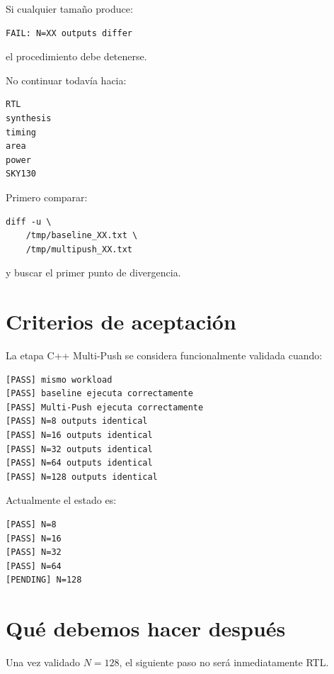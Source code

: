 \documentclass[11pt,a4paper]{article}
\begin{document}
Si cualquier tamaño produce:

\begin{lstlisting}[style=textfile]
FAIL: N=XX outputs differ
\end{lstlisting}

el procedimiento debe detenerse.

No continuar todavía hacia:

\begin{lstlisting}[style=textfile]
RTL
synthesis
timing
area
power
SKY130
\end{lstlisting}

Primero comparar:

\begin{lstlisting}[style=terminal]
diff -u \
    /tmp/baseline_XX.txt \
    /tmp/multipush_XX.txt
\end{lstlisting}

y buscar el primer punto de divergencia.

\section{Criterios de aceptación}

La etapa C++ Multi-Push se considera funcionalmente validada cuando:

\begin{lstlisting}[style=textfile]
[PASS] mismo workload
[PASS] baseline ejecuta correctamente
[PASS] Multi-Push ejecuta correctamente
[PASS] N=8 outputs identical
[PASS] N=16 outputs identical
[PASS] N=32 outputs identical
[PASS] N=64 outputs identical
[PASS] N=128 outputs identical
\end{lstlisting}

Actualmente el estado es:

\begin{lstlisting}[style=textfile]
[PASS] N=8
[PASS] N=16
[PASS] N=32
[PASS] N=64
[PENDING] N=128
\end{lstlisting}

\section{Qué debemos hacer después}

Una vez validado $N=128$, el siguiente paso no será inmediatamente RTL.
\end{document}
